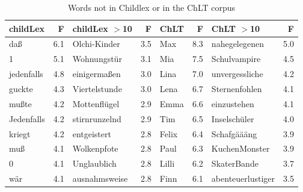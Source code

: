 \documentclass[manuscript]{stjour}
\begin{document}
\begin{table}[!htbp]
\caption{Words not in Childlex or in the ChLT corpus}
\centering
\begin{tabular}{lrlrlrlr}
  \hline
childLex & F & childLex $>$10 & F & ChLT & F & ChLT $>$10 & F \\ 
  \hline
daß & 6.1 & Olchi-Kinder & 3.5 & Max & 8.3 & nahegelegenen & 5.0 \\ 
  1 & 5.1 & Wohnungstür & 3.1 & Mia & 7.5 & Schulvampire & 4.5 \\ 
  jedenfalls & 4.8 & einigermaßen & 3.0 & Lina & 7.0 & unvergessliche & 4.2 \\ 
  guckte & 4.3 & Viertelstunde & 3.0 & Lena & 6.7 & Sternenfohlen & 4.1 \\ 
  mußte & 4.2 & Mottenflügel & 2.9 & Emma & 6.6 & einzustehen & 4.1 \\ 
  Jedenfalls & 4.2 & stirnrunzelnd & 2.9 & Tim & 6.5 & Inselschüler & 4.0 \\ 
  kriegt & 4.2 & entgeistert & 2.8 & Felix & 6.4 & Schafgäääng & 3.9 \\ 
  muß & 4.1 & Wolkenpfote & 2.8 & Paul & 6.3 & KuchenMonster & 3.9 \\ 
  0 & 4.1 & Unglaublich & 2.8 & Lilli & 6.2 & SkaterBande & 3.7 \\ 
  wär & 4.1 & ausnahmsweise & 2.8 & Finn & 6.1 & abenteuerlustiger & 3.5 \\ 
   \hline
\end{tabular}
\label{words-chlt}
\end{table}
\end{document}
